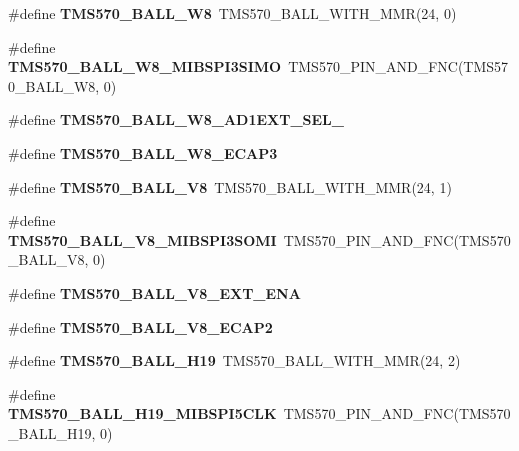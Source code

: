 \begin{DoxyCompactItemize}
\#define {\bfseries T\+M\+S570\+\_\+\+B\+A\+L\+L\+\_\+\+W8}~T\+M\+S570\+\_\+\+B\+A\+L\+L\+\_\+\+W\+I\+T\+H\+\_\+\+M\+MR(24, 0)
\item 
\mbox{\label{tms570lc4357-pins_8h_a207cc76a6d3cd31fee68ae58faf51abb}} 
\#define {\bfseries T\+M\+S570\+\_\+\+B\+A\+L\+L\+\_\+\+W8\+\_\+\+M\+I\+B\+S\+P\+I3\+S\+I\+MO}~T\+M\+S570\+\_\+\+P\+I\+N\+\_\+\+A\+N\+D\+\_\+\+F\+NC(T\+M\+S570\+\_\+\+B\+A\+L\+L\+\_\+\+W8, 0)
\item 
\#define {\bfseries T\+M\+S570\+\_\+\+B\+A\+L\+L\+\_\+\+W8\+\_\+\+A\+D1\+E\+X\+T\+\_\+\+S\+E\+L\+\_}
\item 
\#define {\bfseries T\+M\+S570\+\_\+\+B\+A\+L\+L\+\_\+\+W8\+\_\+\+E\+C\+A\+P3}
\item 
\mbox{\label{tms570lc4357-pins_8h_a44f45e18a0f8cedbf95fe6745a366cc7}} 
\#define {\bfseries T\+M\+S570\+\_\+\+B\+A\+L\+L\+\_\+\+V8}~T\+M\+S570\+\_\+\+B\+A\+L\+L\+\_\+\+W\+I\+T\+H\+\_\+\+M\+MR(24, 1)
\item 
\mbox{\label{tms570lc4357-pins_8h_a773fe347138d4f55f4dd384e262f6cdb}} 
\#define {\bfseries T\+M\+S570\+\_\+\+B\+A\+L\+L\+\_\+\+V8\+\_\+\+M\+I\+B\+S\+P\+I3\+S\+O\+MI}~T\+M\+S570\+\_\+\+P\+I\+N\+\_\+\+A\+N\+D\+\_\+\+F\+NC(T\+M\+S570\+\_\+\+B\+A\+L\+L\+\_\+\+V8, 0)
\item 
\#define {\bfseries T\+M\+S570\+\_\+\+B\+A\+L\+L\+\_\+\+V8\+\_\+\+E\+X\+T\+\_\+\+E\+NA}
\item 
\#define {\bfseries T\+M\+S570\+\_\+\+B\+A\+L\+L\+\_\+\+V8\+\_\+\+E\+C\+A\+P2}
\item 
\mbox{\label{tms570lc4357-pins_8h_a70ec25fd5884725bb159aca85d614cdb}} 
\#define {\bfseries T\+M\+S570\+\_\+\+B\+A\+L\+L\+\_\+\+H19}~T\+M\+S570\+\_\+\+B\+A\+L\+L\+\_\+\+W\+I\+T\+H\+\_\+\+M\+MR(24, 2)
\item 
\mbox{\label{tms570lc4357-pins_8h_aeb5ea49bce0f87b251bee68a3f2084d9}} 
\#define {\bfseries T\+M\+S570\+\_\+\+B\+A\+L\+L\+\_\+\+H19\+\_\+\+M\+I\+B\+S\+P\+I5\+C\+LK}~T\+M\+S570\+\_\+\+P\+I\+N\+\_\+\+A\+N\+D\+\_\+\+F\+NC(T\+M\+S570\+\_\+\+B\+A\+L\+L\+\_\+\+H19, 0)
\item 
\mbox{\label{tms570lc4357-pins_8h_a1f08792859c47dc8c88073ddba1e3a99}} 

\end{DoxyCompactItemize}
